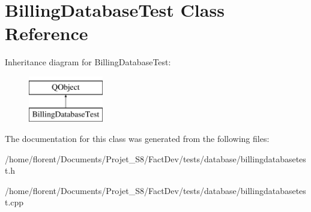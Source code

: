 \hypertarget{classBillingDatabaseTest}{\section{Billing\-Database\-Test Class Reference}
\label{classBillingDatabaseTest}
}
Inheritance diagram for Billing\-Database\-Test\-:\begin{figure}[H]
\begin{center}
\leavevmode
\includegraphics[height=2.000000cm]{d1/db1/classBillingDatabaseTest}
\end{center}
\end{figure}


The documentation for this class was generated from the following files\-:\begin{DoxyCompactItemize}
\item 
/home/florent/\-Documents/\-Projet\-\_\-\-S8/\-Fact\-Dev/tests/database/billingdatabasetest.\-h\item 
/home/florent/\-Documents/\-Projet\-\_\-\-S8/\-Fact\-Dev/tests/database/billingdatabasetest.\-cpp\end{DoxyCompactItemize}
